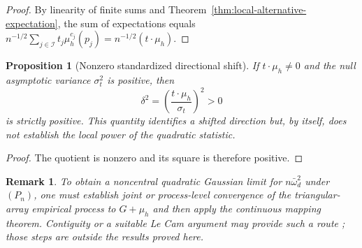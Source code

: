 \documentclass[pdflatex]{sn-jnl}
\theoremstyle{thmstyleone}
\newtheorem{proposition}[theorem]{Proposition}
\theoremstyle{thmstyletwo}
\newtheorem{remark}{Remark}
\theoremstyle{thmstylethree}
\begin{document}
\begin{appendices}
\begin{proof}
By linearity of finite sums and Theorem~\ref{thm:local-alternative-expectation}, the sum of expectations equals $n^{-1/2} \sum_{j\in\mathcal I} t_j \mu_h^{c_j}(p_j) = n^{-1/2} (t \cdot \mu_h)$.
\end{proof}

\begin{proposition}[Nonzero standardized directional shift]\label{thm:local-power-noncentrality}
If $t\cdot\mu_h\ne0$ and the null asymptotic variance $\sigma_t^2$ is positive, then
\[
  \delta^2 = \left( \frac{t \cdot \mu_h}{\sigma_t} \right)^2 > 0
\]
is strictly positive. This quantity identifies a shifted direction but, by itself, does not establish the local power of the quadratic statistic.
\end{proposition}

\begin{proof}
The quotient is nonzero and its square is therefore positive.
\end{proof}

\begin{remark}
To obtain a noncentral quadratic Gaussian limit for $n\bar\omega_d^2$ under $(P_n)$, one must establish joint or process-level convergence of the triangular-array empirical process to $G+\mu_h$ and then apply the continuous mapping theorem. Contiguity or a suitable Le Cam argument may provide such a route \cite{LeCam1986}; those steps are outside the results proved here.
\end{remark}

\end{appendices}



\end{document}
